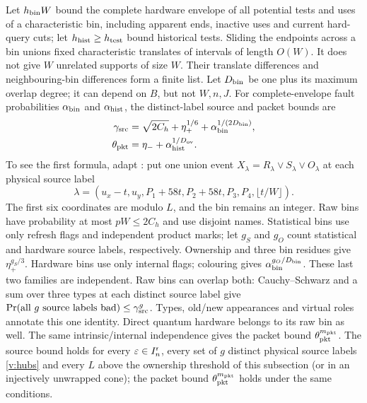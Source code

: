 Let \(h_{\rm bin}W\) bound the complete hardware envelope of all
potential tests and uses of a characteristic bin, including apparent
ends, inactive uses and current hard-query cuts; let
\(h_{\rm hist}\ge h_{\rm test}\) bound historical tests. Sliding the
endpoints across a bin unions fixed characteristic translates of
intervals of length \(O(W)\). It does not give \(W\) unrelated supports
of size \(W\). Their translate differences and neighbouring-bin
differences form a finite list. Let \(D_{\rm bin}\) be one plus its
maximum overlap degree; it can depend on \(B\), but not \(W,n,J\).
For complete-envelope fault probabilities \(\alpha_{\rm bin}\) and
\(\alpha_{\rm hist}\), the distinct-label source and packet bounds are
\begin{equation}\label{v:joint}
\begin{aligned}
 \gamma_{\rm src}&=\sqrt{2C_h}+\eta_+^{1/6}
                   +\alpha_{\rm bin}^{1/(2D_{\rm bin})},\\
 \theta_{\rm pkt}&=\eta_-+\alpha_{\rm hist}^{1/D_{\rm ov}}.
\end{aligned}
\end{equation}
To see the first formula, adapt \cite[Lemma~6.3]{DMNoise2026}: put one union event
\(X_\lambda=R_\lambda\lor S_\lambda\lor O_\lambda\) at each physical source label
\begin{equation}\label{v:hubs}
 \lambda=(u_x-t,u_y,P_1+58t,P_2+58t,P_3,P_4,\lfloor t/W\rfloor).
\end{equation}
The first six coordinates are modulo \(L\), and the bin remains an
integer. Raw bins have probability at most \(pW\le2C_h\) and use
disjoint names. Statistical bins use only refresh flags and independent
product marks; let \(g_S\) and \(g_O\) count statistical and hardware source labels, respectively. Ownership and three bin residues give
\(\eta_+^{g_S/3}\). Hardware bins use only internal flags; colouring
 gives \(\alpha_{\rm bin}^{g_O/D_{\rm bin}}\). These last two families
are independent. Raw bins can overlap both: Cauchy--Schwarz and a sum
over three types at each distinct source label give
\(\Pr(\text{all }g\text{ source labels bad})\le\gamma_{\rm src}^g\).
Types, old/new appearances and virtual roles annotate this one identity.
Direct quantum hardware belongs to its raw bin as well. The same
intrinsic/internal independence gives the packet bound
\(\theta_{\rm pkt}^{m_{\rm pkt}}\). The source bound holds for every
\(\varepsilon\in I_n^{\mathsf r}\), every set of \(g\) distinct physical source
labels \eqref{v:hubs} and every \(L\) above the ownership threshold of
this subsection (or in an injectively unwrapped cone); the packet bound
\(\theta_{\rm pkt}^{m_{\rm pkt}}\) holds under the same conditions.

